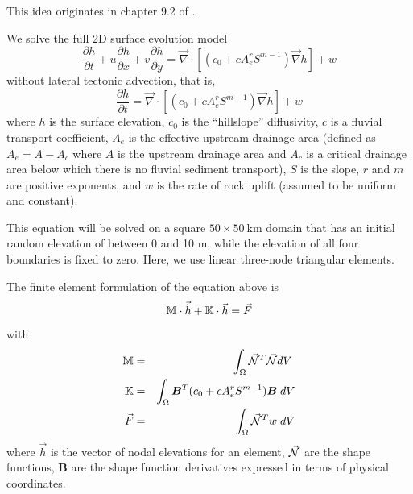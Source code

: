 
This \stone idea originates in chapter 9.2 of \textcite{simp17}. 

We solve the full 2D surface evolution model 
\begin{equation}
\frac{\partial h}{\partial t}
+ u \frac{\partial h}{\partial x}
+ v \frac{\partial h}{\partial y}
= \vec\nabla\cdot \left[ (c_0 + c A_e^r S^{m-1}) \vec\nabla h \right] + w
\end{equation}
without lateral tectonic advection, that is,
\begin{equation}
\frac{\partial h}{\partial t}
= \vec\nabla\cdot \left[ (c_0 + c A_e^r S^{m-1}) \vec\nabla h \right] + w
\end{equation}
where $h$ is the surface elevation, 
$c_0$ is the ``hillslope'' diffusivity, 
$c$ is a fluvial transport coefficient, $A_e$ 
is the effective upstream drainage area (defined as $A_e = A - A_c$ 
where $A$ is the upstream drainage
area and $A_c$ is a critical drainage area below which there is no fluvial sediment transport),
$S$ is the slope, 
$r$ and $m$ are positive exponents, and $w$ is the rate of rock uplift (assumed to be uniform and constant).

This equation will be solved on a square $50\times 50~\si{\km}$ 
domain that has an initial random elevation of
between 0 and 10 m, while the elevation of all four boundaries is fixed to zero. 
Here, we use linear three-node triangular elements.

The finite element formulation of the equation above is 
\[
{\mathbb{M}} \cdot \vec{\dot h} + {\mathbb{K}} \cdot \vec{h} = \vec{F} 
\]
with 
\begin{eqnarray}
{\mathbb{M}} &=& \int_\Omega \vec{{\mathcal{N}}}^T \vec{{\mathcal{N}}} dV \; \nonumber\\
{\mathbb{K}} &=& \int_\Omega {\bm B}^T (c_0 + c A_e^r S^{m-1})  {\bm B} \;  dV \nonumber\\
\vec{F} &=& \int_\Omega  \vec{{\mathcal{N}}}^T w \; dV
\end{eqnarray}
where $\vec{h}$ is the vector of nodal elevations for an element, $\vec{{\mathcal{N}}}$ 
are the shape functions, ${\bm B}$ are the shape function derivatives expressed 
in terms of physical coordinates.

